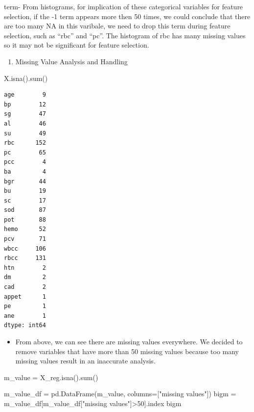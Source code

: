 \documentclass[
  11pt,
  letterpaper,
  DIV=11,
  numbers=noendperiod]{scrartcl}
\newenvironment{Shaded}{\begin{snugshade}}{\end{snugshade}}
\newcommand{\BuiltInTok}[1]{\textcolor[rgb]{0.00,0.23,0.31}{#1}}
\newcommand{\DecValTok}[1]{\textcolor[rgb]{0.68,0.00,0.00}{#1}}
\newcommand{\NormalTok}[1]{\textcolor[rgb]{0.00,0.23,0.31}{#1}}
\newcommand{\OperatorTok}[1]{\textcolor[rgb]{0.37,0.37,0.37}{#1}}
\newcommand{\StringTok}[1]{\textcolor[rgb]{0.13,0.47,0.30}{#1}}
\providecommand{\tightlist}{%
  \setlength{\itemsep}{0pt}\setlength{\parskip}{0pt}}\usepackage{longtable,booktabs,array}
\begin{document}
term- From histograms, for implication of these categorical variables
for feature selection, if the -1 term appears more then 50 times, we
could conclude that there are too many NA in this varibale, we need to
drop this term during feature selection, such as ``rbc'' and ``pc''. The
histogram of rbc has many missing values so it may not be significant
for feature selection.

\begin{enumerate}
\def\labelenumi{\arabic{enumi}.}
\setcounter{enumi}{4}
\tightlist
\item
  Missing Value Analysis and Handling
\end{enumerate}

\begin{Shaded}
\begin{Highlighting}[]
\NormalTok{X.isna().}\BuiltInTok{sum}\NormalTok{()}
\end{Highlighting}
\end{Shaded}

\begin{verbatim}
age        9
bp        12
sg        47
al        46
su        49
rbc      152
pc        65
pcc        4
ba         4
bgr       44
bu        19
sc        17
sod       87
pot       88
hemo      52
pcv       71
wbcc     106
rbcc     131
htn        2
dm         2
cad        2
appet      1
pe         1
ane        1
dtype: int64
\end{verbatim}

\begin{itemize}
\tightlist
\item
  From above, we can see there are missing values everywhere. We decided
  to remove variables that have more than 50 missing values because too
  many missing values result in an inaccurate analysis.
\end{itemize}

\begin{Shaded}
\begin{Highlighting}[]
\NormalTok{m\_value }\OperatorTok{=}\NormalTok{ X\_reg.isna().}\BuiltInTok{sum}\NormalTok{()}

\NormalTok{m\_value\_df }\OperatorTok{=}\NormalTok{ pd.DataFrame(m\_value, columns}\OperatorTok{=}\NormalTok{[}\StringTok{"missing values"}\NormalTok{])}
\NormalTok{bigm }\OperatorTok{=}\NormalTok{ m\_value\_df[m\_value\_df[}\StringTok{"missing values"}\NormalTok{]}\OperatorTok{\textgreater{}}\DecValTok{50}\NormalTok{].index}
\NormalTok{bigm}
\end{Highlighting}
\end{Shaded}
\end{document}
